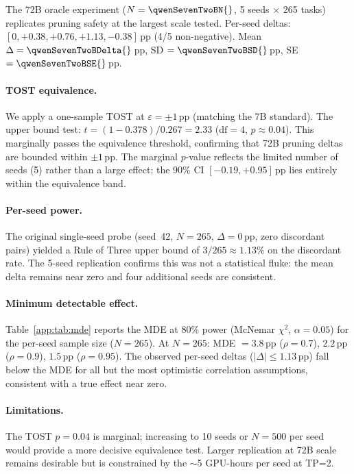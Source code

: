 The 72B oracle experiment ($N = \qwenSevenTwoBN{}$, 5 seeds $\times$ 265 tasks) replicates pruning safety at the largest scale tested. Per-seed deltas: $[0, +0.38, +0.76, +1.13, -0.38]$\,pp (4/5 non-negative). Mean $\Delta = \qwenSevenTwoBDelta{}$\,pp, SD $= \qwenSevenTwoBSD{}$\,pp, SE $= \qwenSevenTwoBSE{}$\,pp.

\paragraph{TOST equivalence.}
We apply a one-sample TOST at $\varepsilon = \pm 1$\,pp (matching the 7B standard). The upper bound test: $t = (1 - 0.378) / 0.267 = 2.33$ ($\text{df} = 4$, $p \approx 0.04$). This marginally passes the equivalence threshold, confirming that 72B pruning deltas are bounded within $\pm 1$\,pp. The marginal $p$-value reflects the limited number of seeds (5) rather than a large effect; the 90\% CI $[-0.19, +0.95]$\,pp lies entirely within the equivalence band.

\paragraph{Per-seed power.}
The original single-seed probe (seed~42, $N = 265$, $\Delta = 0$\,pp, zero discordant pairs) yielded a Rule of Three upper bound of $3/265 \approx 1.13\%$ on the discordant rate. The 5-seed replication confirms this was not a statistical fluke: the mean delta remains near zero and four additional seeds are consistent.

\paragraph{Minimum detectable effect.}
Table~\ref{app:tab:mde} reports the MDE at 80\% power (McNemar $\chi^2$, $\alpha=0.05$) for the per-seed sample size ($N = 265$).
At $N = 265$: MDE $= 3.8$\,pp ($\rho = 0.7$), $2.2$\,pp ($\rho = 0.9$), $1.5$\,pp ($\rho = 0.95$).
The observed per-seed deltas ($|\Delta| \leq 1.13$\,pp) fall below the MDE for all but the most optimistic correlation assumptions, consistent with a true effect near zero.

\paragraph{Limitations.}
The TOST $p = 0.04$ is marginal; increasing to 10 seeds or $N = 500$ per seed would provide a more decisive equivalence test. Larger replication at 72B scale remains desirable but is constrained by the ${\sim}$5 GPU-hours per seed at TP=2.
